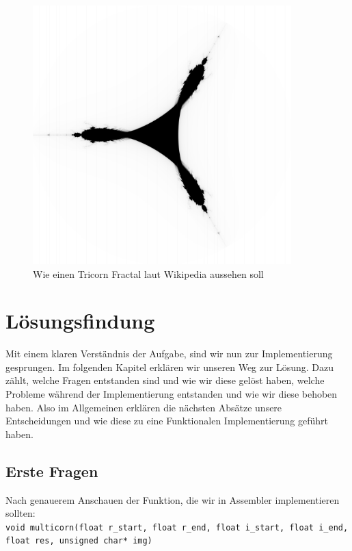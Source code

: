 \documentclass[course=erap]{aspdoc}
\begin{document}
\begin{figure}
    \centering
    \includegraphics[width=100mm]{img/Tricorn_expected.png}
    \caption{Wie einen Tricorn Fractal laut Wikipedia aussehen soll \cite{tricorn_expected}}
    \label{fig:tricorn_expected}
\end{figure}

\section{Lösungsfindung}\label{section:losungsfindung}

Mit einem klaren Verst\"andnis der Aufgabe, sind wir nun zur Implementierung gesprungen. Im folgenden Kapitel erkl\"aren wir unseren Weg zur L\"osung. Dazu z\"ahlt, welche Fragen entstanden sind und wie wir diese gel\"ost haben, welche Probleme w\"ahrend der Implementierung entstanden und wie wir diese behoben haben. Also im Allgemeinen erkl\"aren die n\"achsten Abs\"atze unsere Entscheidungen und wie diese zu eine Funktionalen Implementierung gef\"uhrt haben. 

\subsection{Erste Fragen}

Nach genauerem Anschauen der Funktion, die wir in Assembler implementieren sollten: \\

\lstinline{void multicorn(float r_start, float r_end, float i_start, float i_end, float res, unsigned char* img)} \\
\end{document}
